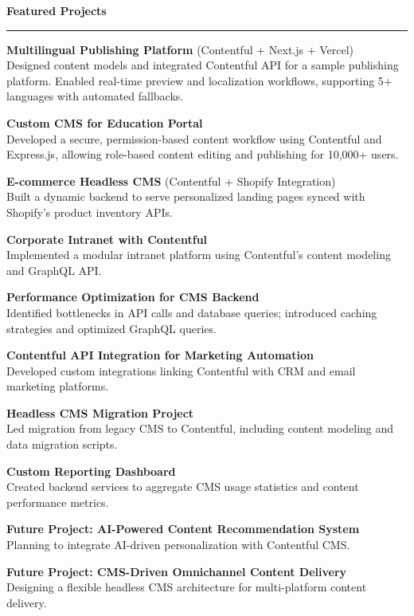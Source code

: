 \documentclass[a4paper,10pt]{article}
\newcommand{\sectiontitle}[1]{\vspace{6pt}\noindent\textbf{\large #1}\vspace{3pt}\hrule\vspace{6pt}}
\newenvironment{smallprojects}{
	\begingroup
	\small
	\setlength{\parskip}{3pt}
}{
	\endgroup
}
\begin{document}
	\sectiontitle{Featured Projects}
	\begin{smallprojects}
		\textbf{Multilingual Publishing Platform} (Contentful + Next.js + Vercel) \\
		Designed content models and integrated Contentful API for a sample publishing platform. Enabled real-time preview and localization workflows, supporting 5+ languages with automated fallbacks.
		
		\textbf{Custom CMS for Education Portal} \\
		Developed a secure, permission-based content workflow using Contentful and Express.js, allowing role-based content editing and publishing for 10,000+ users.
		
		\textbf{E-commerce Headless CMS} (Contentful + Shopify Integration) \\
		Built a dynamic backend to serve personalized landing pages synced with Shopify’s product inventory APIs.
		
		\textbf{Corporate Intranet with Contentful} \\
		Implemented a modular intranet platform using Contentful’s content modeling and GraphQL API.
		
		\textbf{Performance Optimization for CMS Backend} \\
		Identified bottlenecks in API calls and database queries; introduced caching strategies and optimized GraphQL queries.
		
		\textbf{Contentful API Integration for Marketing Automation} \\
		Developed custom integrations linking Contentful with CRM and email marketing platforms.
		
		\textbf{Headless CMS Migration Project} \\
		Led migration from legacy CMS to Contentful, including content modeling and data migration scripts.
		
		\textbf{Custom Reporting Dashboard} \\
		Created backend services to aggregate CMS usage statistics and content performance metrics.
		
		\textbf{Future Project: AI-Powered Content Recommendation System} \\
		Planning to integrate AI-driven personalization with Contentful CMS.
		
		\textbf{Future Project: CMS-Driven Omnichannel Content Delivery} \\
		Designing a flexible headless CMS architecture for multi-platform content delivery.
	\end{smallprojects}
	
\end{document}
